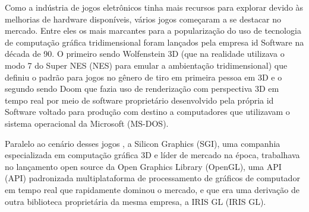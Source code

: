 Como a indústria de jogos eletrônicos tinha mais recursos para explorar devido às melhorias de hardware disponíveis, vários jogos começaram a se destacar no mercado. Entre eles os mais marcantes para a popularização do uso de tecnologia de computação gráfica tridimensional foram lançados pela empresa id Software na década de 90. O primeiro sendo Wolfenstein 3D (que na realidade utilizava o modo 7 do Super NES (\acrlong{NES}) para emular a ambientação tridimensional) que definiu o padrão para jogos no gênero de tiro em primeira pessoa em 3D e o segundo sendo Doom que fazia uso de renderização com perspectiva 3D em tempo real por meio de software proprietário desenvolvido pela própria id Software voltado para produção com destino a computadores que utilizavam o sistema operacional da Microsoft (\acrshort{MS-DOS}).

    \begin{figure}[h!]
		\centering
	\end{figure}
	\nocite{figura3}
	
Paralelo ao cenário desses jogos \cite{openGLBook}, a Silicon Graphics (\acrshort{SGI}), uma companhia especializada em computação gráfica 3D e líder de mercado na época, trabalhava no lançamento open source da Open Graphics Library (\acrshort{OpenGL}), uma API (\acrlong{API}) padronizada multiplataforma de processamento de gráficos de computador em tempo real que rapidamente dominou o mercado, e que era uma derivação de outra biblioteca proprietária da mesma empresa, a IRIS GL (\acrlong{IRIS GL}). 

